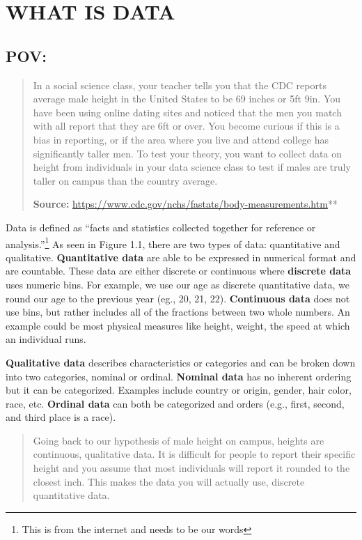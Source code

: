 \documentclass[
]{book}
\begin{document}
\hypertarget{what-is-data}{%
\section{WHAT IS DATA}\label{what-is-data}}

\hypertarget{pov}{%
\subsection{POV:}\label{pov}}

\begin{quote}
In a social science class, your teacher tells you that the CDC
reports average male height in the United States to be 69
inches or 5ft 9in. You have been using online dating sites and
noticed that the men you match with all report that they are
6ft or over. You become curious if this is a bias in reporting,
or if the area where you live and attend college has
significantly taller men. To test your theory, you want to
collect data on height from individuals in your data science
class to test if males are truly taller on campus than the
country average.

\textbf{Source:} \url{https://www.cdc.gov/nchs/fastats/body-measurements.htm}**
\end{quote}

Data is defined as ``facts and statistics collected together for
reference or analysis.''\footnote{This is from the internet and needs to
  be our words} As seen in Figure 1.1, there are two types of data:
quantitative and qualitative. \textbf{Quantitative data} are able to
be expressed in numerical format and are countable. These data
are either discrete or continuous where \textbf{discrete data} uses
numeric bins. For example, we use our age as discrete
quantitative data, we round our age to the previous year (eg.,
20, 21, 22). \textbf{Continuous data} does not use bins, but rather
includes all of the fractions between two whole numbers. An
example could be most physical measures like height, weight, the
speed at which an individual runs.

\textbf{Qualitative data} describes characteristics or categories and
can be broken down into two categories, nominal or ordinal.
\textbf{Nominal data} has no inherent ordering but it can be
categorized. Examples include country or origin, gender, hair
color, race, etc. \textbf{Ordinal data} can both be categorized and
orders (e.g., first, second, and third place is a race).

\begin{quote}
Going back to our hypothesis of male height on campus, heights
are continuous, qualitative data. It is difficult for people to
report their specific height and you assume that most
individuals will report it rounded to the closest inch. This
makes the data you will actually use, discrete quantitative
data.
\end{quote}
\end{document}
